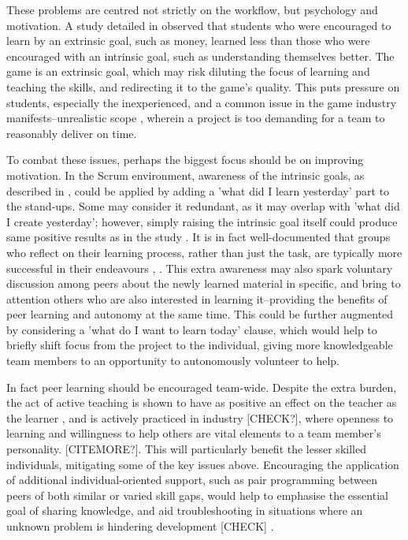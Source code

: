\documentclass{scrartcl}
\begin{document}
These problems are centred not strictly on the workflow, but psychology and motivation. A study detailed in \cite{motivation} observed that students who were encouraged to learn by an extrinsic goal, such as money, learned less than those who were encouraged with an intrinsic goal, such as understanding themselves better. The game is an extrinsic goal, which may risk diluting the focus of learning and teaching the skills, and redirecting it to the game's quality. This puts pressure on students, especially the inexperienced, and a common issue in the game industry manifests--unrealistic scope \cite{problems}, wherein a project is too demanding for a team to reasonably deliver on time.

To combat these issues, perhaps the biggest focus should be on improving motivation. In the Scrum environment, awareness of the intrinsic goals, as described in \cite{motivation}, could be applied by adding a 'what did I learn yesterday' part to the stand-ups. Some may consider it redundant, as it may overlap with 'what did I create yesterday'; however, simply raising the intrinsic goal itself could produce same positive results as in the study \cite{motivation}. It is in fact well-documented that groups who reflect on their learning process, rather than just the task, are typically more successful in their endeavours \cite{effectivegroups}, \cite{learningreflection}. This extra awareness may also spark voluntary discussion among peers about the newly learned material in specific, and bring to attention others who are also interested in learning it--providing the benefits of peer learning and autonomy at the same time. This could be further augmented by considering a 'what do I want to learn today' clause, which would help to briefly shift focus from the project to the individual, giving more knowledgeable team members to an opportunity to autonomously volunteer to help.

In fact peer learning should be encouraged team-wide. Despite the extra burden, the act of active teaching is shown to have as positive an effect on the teacher as the learner \cite{activepassive}, and is actively practiced in industry \cite{devstudy}[CHECK?], where openness to learning \cite{devstudy} and willingness to help others \cite{collaboration} are vital elements to a team member's personality. [CITEMORE?]. This will particularly benefit the lesser skilled individuals, mitigating some of the key issues above. Encouraging the application of additional individual-oriented support, such as pair programming between peers of both similar or varied skill gaps, would help to emphasise the essential goal of sharing knowledge, and aid troubleshooting in situations where an unknown problem is hindering development \cite{collaboration} [CHECK] \cite{motivation} \cite{devstudy}.
\end{document}
